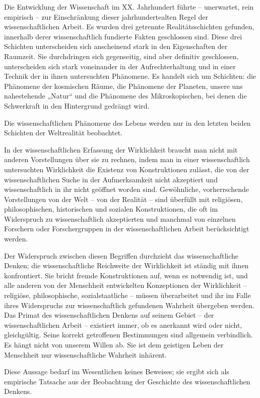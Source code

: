 \documentclass[11pt,a4paper]{book}
\begin{document}
Die Entwicklung der Wissenschaft im XX. Jahrhundert führte -- unerwartet, rein empirisch -- zur Einschränkung dieser jahrhundertealten Regel der wissenschaftlichen Arbeit. Es wurden drei getrennte Realitätsschichten gefunden, innerhalb derer wissenschaftlich fundierte Fakten geschlossen sind. Diese drei Schichten unterscheiden sich anscheinend stark in den Eigenschaften der Raumzeit. Sie durchdringen sich gegenseitig, sind aber definitiv geschlossen, unterscheiden sich stark voneinander in der Aufrechterhaltung und in einer Technik der in ihnen untersuchten Phänomene. Es handelt sich um Schichten: die Phänomene der kosmischen Räume, die Phänomene der Planeten, unsere uns nahestehende „Natur“ und die Phänomene des Mikroskopischen, bei denen die Schwerkraft in den Hintergrund gedrängt wird. 

Die wissenschaftlichen Phänomene des Lebens werden nur in den letzten beiden Schichten der Weltrealität beobachtet. 

In der wissenschaftlichen Erfassung der Wirklichkeit braucht man nicht mit anderen Vorstellungen über sie zu rechnen, indem man in einer wissenschaftlich untersuchten Wirklichkeit die Existenz von Konstruktionen zulässt, die von der wissenschaftlichen Suche in der Aufmerksamkeit nicht akzeptiert und wissenschaftlich in ihr nicht geöffnet worden sind. Gewöhnliche, vorherrschende Vorstellungen von der Welt -- von der Realität -- sind überfüllt mit religiösen, philosophischen, historischen und sozialen Konstruktionen, die oft im Widerspruch zu wissenschaftlich akzeptierten und manchmal von einzelnen Forschern oder Forschergruppen in der wissenschaftlichen Arbeit berücksichtigt werden. 

Der Widerspruch zwischen diesen Begriffen durchzieht das wissenschaftliche Denken; die wissenschaftliche Reichweite der Wirklichkeit ist ständig mit ihnen konfrontiert. Sie bricht fremde Konstruktionen auf, wenn es notwendig ist, und alle anderen von der Menschheit entwickelten Konzeptionen der Wirklichkeit -- religiöse, philosophische, sozialstaatliche -- müssen überarbeitet und ihr im Falle ihres Widerspruchs zur wissenschaftlich gefundenen Wahrheit übergeben werden. Das Primat des wissenschaftlichen Denkens auf seinem Gebiet -- der wissenschaftlichen Arbeit -- existiert immer, ob es anerkannt wird oder nicht, gleichgültig. Seine korrekt getroffenen Bestimmungen sind allgemein verbindlich. Es hängt nicht von unserem Willen ab. Sie ist dem geistigen Leben der Menschheit nur wissenschaftliche Wahrheit inhärent. 

Diese Aussage bedarf im Wesentlichen keines Beweises; sie ergibt sich als empirische Tatsache aus der Beobachtung der Geschichte des wissenschaftlichen Denkens. 
\end{document}
